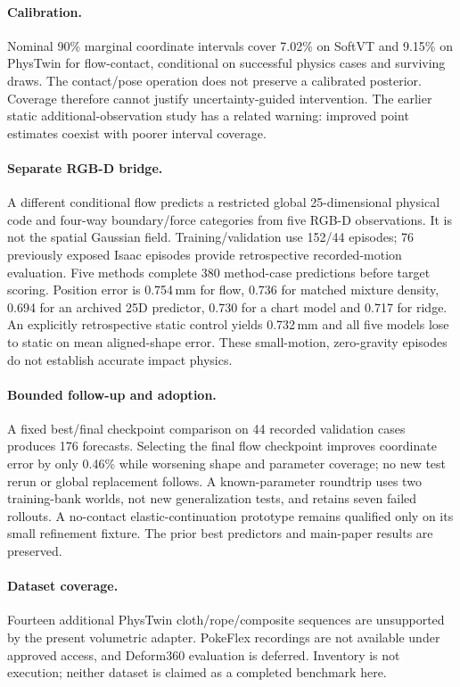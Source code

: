 \documentclass[10pt,twocolumn,letterpaper]{article}
\begin{document}
\paragraph{Calibration.}
Nominal 90\% marginal coordinate intervals cover 7.02\% on SoftVT and 9.15\% on PhysTwin for flow-contact, conditional on successful physics cases and surviving draws. The contact/pose operation does not preserve a calibrated posterior. Coverage therefore cannot justify uncertainty-guided intervention. The earlier static additional-observation study has a related warning: improved point estimates coexist with poorer interval coverage.

\paragraph{Separate RGB-D bridge.}
A different conditional flow predicts a restricted global 25-dimensional physical code and four-way boundary/force categories from five RGB-D observations. It is not the spatial Gaussian field. Training/validation use 152/44 episodes; 76 previously exposed Isaac episodes provide retrospective recorded-motion evaluation. Five methods complete 380 method-case predictions before target scoring. Position error is 0.754\,mm for flow, 0.736 for matched mixture density, 0.694 for an archived 25D predictor, 0.730 for a chart model and 0.717 for ridge. An explicitly retrospective static control yields 0.732\,mm and all five models lose to static on mean aligned-shape error. These small-motion, zero-gravity episodes do not establish accurate impact physics.

\paragraph{Bounded follow-up and adoption.}
A fixed best/final checkpoint comparison on 44 recorded validation cases produces 176 forecasts. Selecting the final flow checkpoint improves coordinate error by only 0.46\% while worsening shape and parameter coverage; no new test rerun or global replacement follows. A known-parameter roundtrip uses two training-bank worlds, not new generalization tests, and retains seven failed rollouts. A no-contact elastic-continuation prototype remains qualified only on its small refinement fixture. The prior best predictors and main-paper results are preserved.

\paragraph{Dataset coverage.}
Fourteen additional PhysTwin cloth/rope/composite sequences are unsupported by the present volumetric adapter. PokeFlex recordings are not available under approved access, and Deform360 evaluation is deferred. Inventory is not execution; neither dataset is claimed as a completed benchmark here.
\end{document}
